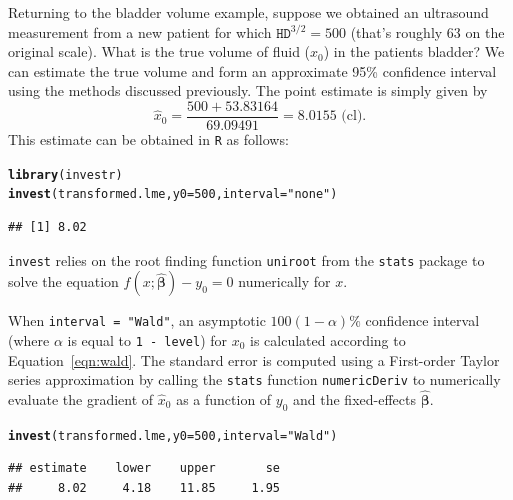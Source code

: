 \documentclass{article}\usepackage[]{graphicx}\usepackage[]{color}
\makeatletter
\newcommand{\hlnum}[1]{\textcolor[rgb]{0.686,0.059,0.569}{#1}}%
\newcommand{\hlstr}[1]{\textcolor[rgb]{0.192,0.494,0.8}{#1}}%
\newcommand{\hlstd}[1]{\textcolor[rgb]{0.345,0.345,0.345}{#1}}%
\newcommand{\hlkwc}[1]{\textcolor[rgb]{0.333,0.667,0.333}{#1}}%
\newcommand{\hlkwd}[1]{\textcolor[rgb]{0.737,0.353,0.396}{\textbf{#1}}}%
\newenvironment{kframe}{%
 \def\at@end@of@kframe{}%
 \ifinner\ifhmode%
  \def\at@end@of@kframe{\end{minipage}}%
  \begin{minipage}{\columnwidth}%
 \fi\fi%
 \def\FrameCommand##1{\hskip\@totalleftmargin \hskip-\fboxsep
 \colorbox{shadecolor}{##1}\hskip-\fboxsep
     \hskip-\linewidth \hskip-\@totalleftmargin \hskip\columnwidth}%
 \MakeFramed {\advance\hsize-\width
   \@totalleftmargin\z@ \linewidth\hsize
   \@setminipage}}%
 {\par\unskip\endMakeFramed%
 \at@end@of@kframe}
\newenvironment{knitrout}{}{} %
\makeatother
\begin{document}
Returning to the bladder volume example, suppose we obtained an ultrasound measurement from a new patient for which $\texttt{HD}^{3/2} = 500$ (that's roughly 63 on the original scale).  What is the true volume of fluid ($x_0$) in the patients bladder?  We can estimate the true volume and form an approximate 95\% confidence interval using the methods discussed previously.  The point estimate is simply given by
\[
  \widehat{x}_0 = \frac{500 + 53.83164}{69.09491} = 8.0155 \text{ (cl)}.
\]
This estimate can be obtained in \texttt{R} as follows:
\begin{knitrout}
\color{fgcolor}\begin{kframe}
\begin{alltt}
\hlkwd{library}\hlstd{(investr)}
\hlkwd{invest}\hlstd{(transformed.lme,} \hlkwc{y0} \hlstd{=} \hlnum{500}\hlstd{,} \hlkwc{interval} \hlstd{=} \hlstr{"none"}\hlstd{)}
\end{alltt}
\begin{verbatim}
## [1] 8.02
\end{verbatim}
\end{kframe}
\end{knitrout}
\texttt{invest} relies on the root finding function \texttt{uniroot} from the \texttt{stats} package to solve the equation $f\left(x; \widehat{\bm{\beta}}\right) - y_0 = 0$ numerically for $x$.  

When \texttt{interval = "Wald"}, an asymptotic $100(1-\alpha)\%$ confidence interval (where $\alpha$ is equal to \texttt{1 - level}) for $x_0$ is calculated according to Equation~\eqref{eqn:wald}. The standard error is computed using a First-order Taylor series approximation by calling the \texttt{stats} function \texttt{numericDeriv} to numerically evaluate the gradient of $\widehat{x}_0$ as a function of $y_0$ and the fixed-effects $\widehat{\bm{\beta}}$.
\begin{knitrout}
\color{fgcolor}\begin{kframe}
\begin{alltt}
\hlkwd{invest}\hlstd{(transformed.lme,} \hlkwc{y0} \hlstd{=} \hlnum{500}\hlstd{,} \hlkwc{interval} \hlstd{=} \hlstr{"Wald"}\hlstd{)}
\end{alltt}
\begin{verbatim}
## estimate    lower    upper       se 
##     8.02     4.18    11.85     1.95
\end{verbatim}
\end{kframe}
\end{knitrout}
\end{document}
